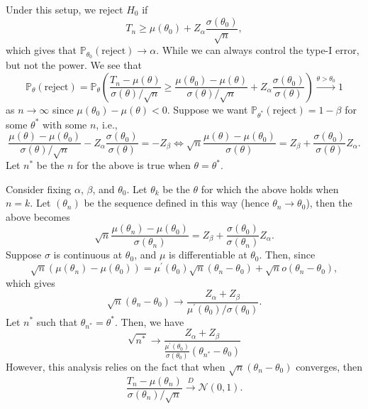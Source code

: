 Under this setup, we reject \(H_0\) if
\[
	T_n \geq \mu (\theta _0) + Z_\alpha \frac{\sigma (\theta _0)}{\sqrt{n} },
\]
which gives that \(\mathbb{P} _{\theta _0}(\text{reject} ) \to \alpha \). While we can always control the type-I error, but not the power. We see that
\[
	\mathbb{P} _{\theta }(\text{reject} )
	= \mathbb{P} _{\theta }\left( \frac{T_n - \mu (\theta )}{\sigma (\theta ) / \sqrt{n} } \geq \frac{\mu (\theta _0) - \mu (\theta )}{\sigma (\theta ) / \sqrt{n} } + Z_\alpha \frac{\sigma (\theta _0)}{\sigma (\theta )} \right)
	\overset{\theta > \theta _0}{\to } 1
\]
as \(n \to \infty \) since \(\mu (\theta _0) - \mu (\theta ) < 0\). Suppose we want \(\mathbb{P} _{\theta ^{\ast} }(\text{reject} ) = 1 - \beta \) for some \(\theta ^{\ast} \) with some \(n\), i.e.,
\[
	\frac{\mu (\theta ) - \mu (\theta _0)}{\sigma (\theta ) / \sqrt{n} } - Z_\alpha \frac{\sigma (\theta _0)}{\sigma (\theta )}
	= -Z_\beta
	\iff \sqrt{n} \frac{\mu (\theta ) - \mu (\theta _0)}{\sigma (\theta )} = Z_\beta + \frac{\sigma (\theta _0)}{\sigma (\theta )} Z_\alpha.
\]
Let \(n^{\ast} \) be the \(n\) for the above is true when \(\theta = \theta ^{\ast} \).

\begin{intuition}

\end{intuition}

Consider fixing \(\alpha \), \(\beta \), and \(\theta _0\). Let \(\theta _k\) be the \(\theta \) for which the above holds when \(n = k\). Let \((\theta _n)\) be the sequence defined in this way (hence \(\theta _n \to \theta _0\)), then the above becomes
\[
	\sqrt{n} \frac{\mu (\theta _n) - \mu (\theta _0)}{\sigma (\theta _n)} = Z_\beta + \frac{\sigma (\theta _0)}{\sigma (\theta _n)} Z_\alpha.
\]
Suppose \(\sigma \) is continuous at \(\theta _0\), and \(\mu \) is differentiable at \(\theta _0\). Then, since
\[
	\sqrt{n} (\mu (\theta _n) - \mu (\theta _0))
	= \mu ^{\prime} (\theta _0) \sqrt{n} (\theta _n - \theta _0) + \sqrt{n} o(\theta _n - \theta _0),
\]
which gives
\[
	\sqrt{n} (\theta _n - \theta _0)
	\to \frac{Z_\alpha + Z_\beta }{\mu ^{\prime} (\theta _0) / \sigma (\theta _0)}.
\]
Let \(n^{\ast} \) such that \(\theta _{n^{\ast} } = \theta ^{\ast} \). Then, we have
\[
	\sqrt{n^{\ast} }
	\to \frac{Z_\alpha + Z_\beta }{\frac{\mu ^{\prime} (\theta _0)}{\sigma (\theta _0)} (\theta _{n^{\ast} } - \theta _0)}
\]
However, this analysis relies on the fact that when \(\sqrt{n} (\theta _n - \theta _0)\) converges, then
\[
	\frac{T_n - \mu (\theta _n)}{\sigma (\theta _n) / \sqrt{n} } \overset{D}{\to} \mathcal{N} (0, 1).
\]